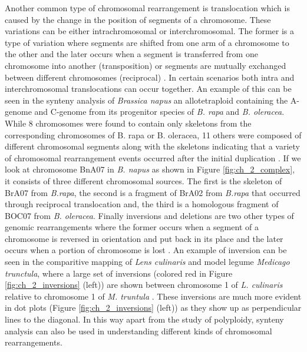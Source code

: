 Another common type of chromosomal rearrangement is translocation which is caused by the change in the position of segments of a chromosome. These variations can be either intrachromosomal or interchromosomal. The former is a type of variation where segments are shifted from one arm of a chromosome to the other and the later occurs when  a segment is transferred from one chromosome into another (transposition) or segments are mutually exchanged between different chromosomes (reciprocal) \cite{rieger2012glossary}. In certain scenarios both intra and interchromosomal translocations can occur together. An example of this can be seen in the synteny analysis of \textit{Brassica napus} an allotetraploid containing the A-genome and C-genome from its progenitor species of \textit{B. rapa} and \textit{B. oleracea}. While 8 chromosomes were found to contain only skeletons from the corresponding chromosomes of B. rapa or B. oleracea, 11 others were composed of different chromosomal segments along with the skeletons indicating that a variety of chromosomal rearrangement events occurred after the initial duplication \cite{parkin2003patterns,cai2014complex}. If we look at chromosome BnA07 in \textit{B. napus} as shown in Figure \ref{fig:ch_2_complex}, it consists of three different chromosomal sources. The first is the skeleton of BrA07 from \textit{B.rapa}, the second is a fragment of BrA02 from \textit{ B.rapa} that occurred through reciprocal translocation and, the third is a homologous fragment of BOC07 from \textit{B. oleracea}. Finally inversions and deletions are two other types of genomic rearrangements where the former occurs when a segment of a chromosome is reversed in orientation and put back in its place and the later occurs when a portion of chromosome is lost \cite{rieger2012glossary}. An example of inversion can be seen in the comparitive mapping of \textit{Lens culinaris} and model legume \textit{Medicago trunctula}, where a large set of inversions (colored red in Figure \ref{fig:ch_2_inversions} (left)) are shown between chromosome 1 of \textit{L. culinaris} relative to chromosome 1 of \textit{M. truntula} \cite{gujaria2014genetic}. These inversions are much more evident in dot plots (Figure \ref{fig:ch_2_inversions} (left)) as they show up as perpendicular lines to the diagonal. In this way apart from the study of polyploidy, synteny analysis can also be used in understanding different kinds of chromosomal rearrangements.

